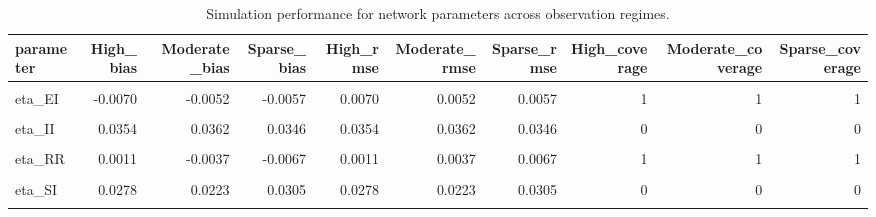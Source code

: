 \begin{table}[!h]
\centering
\caption{\label{tab:tab:net_regime}Simulation performance for network parameters across observation regimes.}
\centering
\fontsize{7}{9}\selectfont
\begin{tabular}[t]{lrrrrrrrrr}
\toprule
parameter & High\_bias & Moderate\_bias & Sparse\_bias & High\_rmse & Moderate\_rmse & Sparse\_rmse & High\_coverage & Moderate\_coverage & Sparse\_coverage\\
\midrule
\cellcolor{gray!10}{eta\_EE} & \cellcolor{gray!10}{-0.0078} & \cellcolor{gray!10}{-0.0014} & \cellcolor{gray!10}{0.0004} & \cellcolor{gray!10}{0.0078} & \cellcolor{gray!10}{0.0014} & \cellcolor{gray!10}{0.0004} & \cellcolor{gray!10}{1} & \cellcolor{gray!10}{1} & \cellcolor{gray!10}{1}\\
eta\_EI & -0.0070 & -0.0052 & -0.0057 & 0.0070 & 0.0052 & 0.0057 & 1 & 1 & 1\\
\cellcolor{gray!10}{eta\_ER} & \cellcolor{gray!10}{-0.0027} & \cellcolor{gray!10}{-0.0091} & \cellcolor{gray!10}{-0.0079} & \cellcolor{gray!10}{0.0027} & \cellcolor{gray!10}{0.0091} & \cellcolor{gray!10}{0.0079} & \cellcolor{gray!10}{1} & \cellcolor{gray!10}{1} & \cellcolor{gray!10}{1}\\
eta\_II & 0.0354 & 0.0362 & 0.0346 & 0.0354 & 0.0362 & 0.0346 & 0 & 0 & 0\\
\cellcolor{gray!10}{eta\_IR} & \cellcolor{gray!10}{-0.0021} & \cellcolor{gray!10}{-0.0064} & \cellcolor{gray!10}{-0.0036} & \cellcolor{gray!10}{0.0021} & \cellcolor{gray!10}{0.0064} & \cellcolor{gray!10}{0.0036} & \cellcolor{gray!10}{1} & \cellcolor{gray!10}{1} & \cellcolor{gray!10}{1}\\
\addlinespace
eta\_RR & 0.0011 & -0.0037 & -0.0067 & 0.0011 & 0.0037 & 0.0067 & 1 & 1 & 1\\
\cellcolor{gray!10}{eta\_SE} & \cellcolor{gray!10}{-0.0007} & \cellcolor{gray!10}{-0.0051} & \cellcolor{gray!10}{-0.0065} & \cellcolor{gray!10}{0.0007} & \cellcolor{gray!10}{0.0051} & \cellcolor{gray!10}{0.0065} & \cellcolor{gray!10}{1} & \cellcolor{gray!10}{1} & \cellcolor{gray!10}{1}\\
eta\_SI & 0.0278 & 0.0223 & 0.0305 & 0.0278 & 0.0223 & 0.0305 & 0 & 0 & 0\\
\cellcolor{gray!10}{eta\_SR} & \cellcolor{gray!10}{-0.0046} & \cellcolor{gray!10}{-0.0023} & \cellcolor{gray!10}{-0.0051} & \cellcolor{gray!10}{0.0046} & \cellcolor{gray!10}{0.0023} & \cellcolor{gray!10}{0.0051} & \cellcolor{gray!10}{1} & \cellcolor{gray!10}{1} & \cellcolor{gray!10}{1}\\

\end{tabular}
\end{table}
